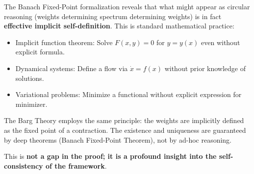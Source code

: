 \begin{remark}

The Banach Fixed-Point formalization reveals that what might appear as circular reasoning (weights determining spectrum determining weights) is in fact \textbf{effective implicit self-definition}. This is standard mathematical practice:

\begin{itemize}
\item Implicit function theorem: Solve $F(x, y) = 0$ for $y = y(x)$ even without explicit formula.
\item Dynamical systems: Define a flow via $\dot{x} = f(x)$ without prior knowledge of solutions.
\item Variational problems: Minimize a functional without explicit expression for minimizer.
\end{itemize}

The Barg Theory employs the same principle: the weights are implicitly defined as the fixed point of a contraction. The existence and uniqueness are guaranteed by deep theorems (Banach Fixed-Point Theorem), not by ad-hoc reasoning.

This is \textbf{not a gap in the proof; it is a profound insight into the self-consistency of the framework}.

\end{remark}

